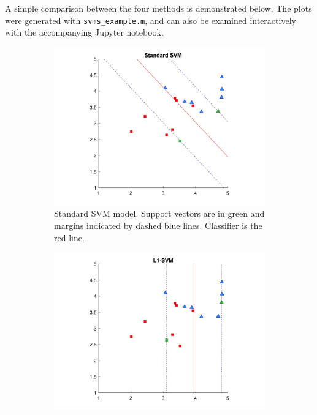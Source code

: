 \documentclass[11pt]{article}
\begin{document}
A simple comparison between the four methods is demonstrated below. The plots were generated with \texttt{svms\_example.m}, and can also be examined interactively with the accompanying Jupyter notebook.

\begin{figure}[hbt!]
	\begin{subfigure}{.48\textwidth}
		\centering
		\captionsetup{font=footnotesize}
		\includegraphics[width=\linewidth]{stand}
		\caption{Standard SVM model. Support vectors are in green and margins indicated by dashed blue lines. Classifier is the red line.}
	\end{subfigure}
	\hfill
	\begin{subfigure}{.48\textwidth}
		\centering
		\captionsetup{font=footnotesize}
		\includegraphics[width=\linewidth]{l1}

\end{subfigure}
\end{figure}
\end{document}

